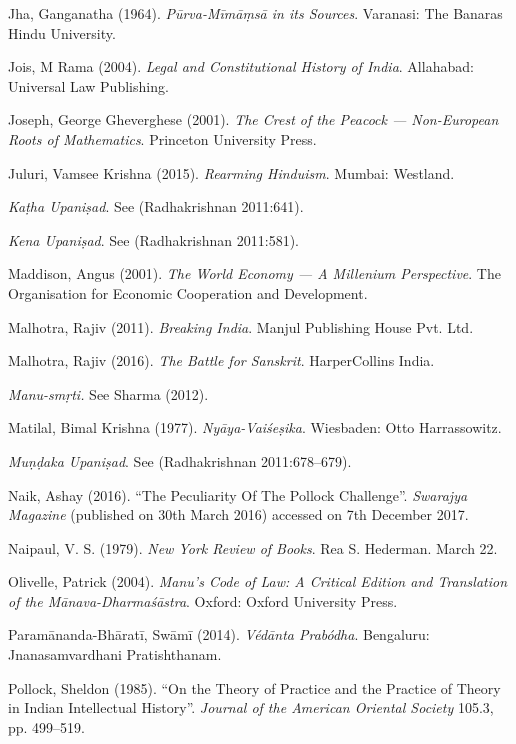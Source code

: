\begin{thebibliography}{99}
Jha, Ganganatha (1964). {\sl Pūrva-Mīmāṃsā in its Sources}. Varanasi: The Banaras Hindu University.

Jois, M Rama (2004). {\sl Legal and Constitutional History of India}. Allahabad: Universal Law Publishing.

Joseph, George Gheverghese (2001). {\sl The Crest of the Peacock --- Non-European Roots of Mathematics}. Princeton University Press.

Juluri, Vamsee Krishna (2015). {\sl Rearming Hinduism}. Mumbai: Westland.

{\sl Kaṭha Upaniṣad}. See (Radhakrishnan 2011:641).

{\sl Kena Upaniṣad}. See (Radhakrishnan 2011:581).

Maddison, Angus (2001). {\sl The World Economy --- A Millenium Perspective}. The Organisation for Economic Cooperation and Development.

Malhotra, Rajiv (2011). {\sl Breaking India}. Manjul Publishing House Pvt. Ltd.

Malhotra, Rajiv (2016). {\sl The Battle for Sanskrit}. HarperCollins India.

{\sl Manu-smṛti.} See Sharma (2012).

Matilal, Bimal Krishna (1977). {\sl Nyāya-Vaiśeṣika}. Wiesbaden: Otto Harrassowitz.

{\sl Muṇḍaka Upaniṣad}. See (Radhakrishnan 2011:678--679).

Naik, Ashay (2016). ``The Peculiarity Of The Pollock Challenge''. {\sl Swarajya Magazine} 
(published on 30th March 2016) accessed on 7th December 2017.

Naipaul, V. S. (1979). {\sl New York Review of Books}. Rea S. Hederman. March 22.

Olivelle, Patrick (2004). {\sl Manu’s Code of Law: A Critical Edition and Translation of the Mānava-Dharmaśāstra}. Oxford: Oxford University Press.

Paramānanda-Bhāratī, Swāmī (2014). {\sl Védānta Prabódha}. Bengaluru: Jnanasamvardhani Pratishthanam.

Pollock, Sheldon (1985). ``On the Theory of Practice and the Practice of Theory in Indian Intellectual History''. {\sl Journal of the American Oriental Society} 105.3, pp. 499--519.


\end{thebibliography}
